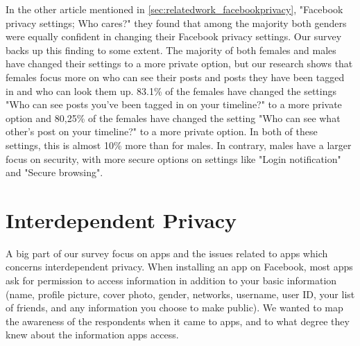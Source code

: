 In the other article mentioned in \ref{sec:relatedwork_facebookprivacy}, "Facebook privacy settings; Who cares?" \cite{whocares} they found that among the majority both genders were equally confident in changing their Facebook privacy settings. Our survey backs up this finding to some extent. The majority of both females and males have changed their settings to a more private option, but our research shows that females focus more on who can see their posts and posts they have been tagged in and who can look them up. 83.1\% of the females have changed the settings "Who can see posts you've been tagged in on your timeline?" to a more private option and 80,25\% of the females have changed the setting "Who can see what other's post on your timeline?" to a more private option. In both of these settings, this is almost 10\% more than for males. In contrary, males have a larger focus on security, with more secure options on settings like "Login notification" and "Secure browsing". 






















\section{Interdependent Privacy}

A big part of our survey focus on apps and the issues related to apps which concerns interdependent privacy. When installing an app on Facebook, most apps ask for permission to access information in addition to your basic information (name, profile picture, cover photo, gender, networks, username, user ID, your list of friends, and any information you choose to make public). We wanted to map the awareness of the respondents when it came to apps, and to what degree they knew about the information apps access. 

